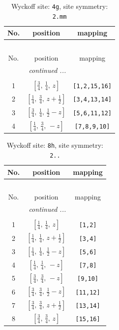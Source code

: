 \documentclass[fleqn,8pt]{jsarticle}
\begin{document}
\renewcommand{\arraystretch}{1.2}
\begin{longtable}{ccc}
\caption{Wyckoff site: {\tt 4g}, site symmetry: {\tt 2.mm}}
 \\
 \hline \hline
No. & position & mapping \\ \hline \endfirsthead

\multicolumn{2}{l}{\tablename\ \thetable{}} \\
 \hline \hline
No. & position & mapping \\ \hline \endhead

 \hline \hline
\multicolumn{2}{r}{\footnotesize\it continued ...} \\ \endfoot

 \hline \hline
\multicolumn{2}{r}{} \\ \endlastfoot

1 & $\left[ \frac{3}{4},\, \frac{1}{4},\, z \right]$ & {\tt [1,2,15,16]} \\ \hline
2 & $\left[ \frac{1}{4},\, \frac{3}{4},\, z + \frac{1}{2} \right]$ & {\tt [3,4,13,14]} \\ \hline
3 & $\left[ \frac{3}{4},\, \frac{1}{4},\, \frac{1}{2} - z \right]$ & {\tt [5,6,11,12]} \\ \hline
4 & $\left[ \frac{1}{4},\, \frac{3}{4},\, - z \right]$ & {\tt [7,8,9,10]} \\
\end{longtable}
\renewcommand{\arraystretch}{1.2}
\begin{longtable}{ccc}
\caption{Wyckoff site: {\tt 8h}, site symmetry: {\tt 2..}}
 \\
 \hline \hline
No. & position & mapping \\ \hline \endfirsthead

\multicolumn{2}{l}{\tablename\ \thetable{}} \\
 \hline \hline
No. & position & mapping \\ \hline \endhead

 \hline \hline
\multicolumn{2}{r}{\footnotesize\it continued ...} \\ \endfoot

 \hline \hline
\multicolumn{2}{r}{} \\ \endlastfoot

1 & $\left[ \frac{1}{4},\, \frac{1}{4},\, z \right]$ & {\tt [1,2]} \\ \hline
2 & $\left[ \frac{1}{4},\, \frac{1}{4},\, z + \frac{1}{2} \right]$ & {\tt [3,4]} \\ \hline
3 & $\left[ \frac{1}{4},\, \frac{1}{4},\, \frac{1}{2} - z \right]$ & {\tt [5,6]} \\ \hline
4 & $\left[ \frac{1}{4},\, \frac{1}{4},\, - z \right]$ & {\tt [7,8]} \\ \hline
5 & $\left[ \frac{3}{4},\, \frac{3}{4},\, - z \right]$ & {\tt [9,10]} \\ \hline
6 & $\left[ \frac{3}{4},\, \frac{3}{4},\, \frac{1}{2} - z \right]$ & {\tt [11,12]} \\ \hline
7 & $\left[ \frac{3}{4},\, \frac{3}{4},\, z + \frac{1}{2} \right]$ & {\tt [13,14]} \\ \hline
8 & $\left[ \frac{3}{4},\, \frac{3}{4},\, z \right]$ & {\tt [15,16]} \\
\end{longtable}
\end{document}
